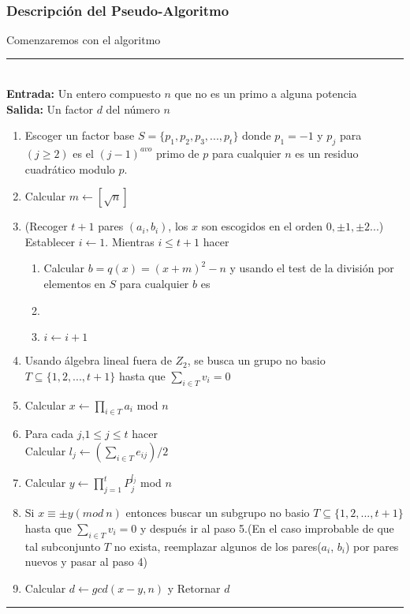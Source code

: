 \documentclass[11pt, conference]{IEEEtran}
\begin{document}
\

\subsubsection[Descripción del Pseudo-Algoritmo]{\textbf{Descripción del Pseudo-Algoritmo}}
Comenzaremos con el algoritmo\\
\rule[0mm]{181mm}{0.1mm}\\
\textbf{Entrada:} Un entero compuesto $n$ que no es un primo a alguna potencia\\
\textbf{Salida:} Un factor $d$ del número $n$
\begin{enumerate}
	\item Escoger un factor base $S=\{p_1,p_2,p_3,...,p_t\}$ donde $p_1 = -1$ y $p_{j}$ para $(j\geq2)$ es el $(j-1)^{avo}$ primo de $p$ para cualquier $n$ es un residuo cuadrático modulo $p$.
	\item Calcular $m  \leftarrow [\sqrt{n}]$
	\item (Recoger $t+1$ pares $(a_{i},b_{i})$, los $x$ son escogidos en el orden $0,\pm1,\pm2...$)\\
	Establecer $i\leftarrow1$. Mientras $i\leq t+1$ hacer
	\begin{enumerate}
		\item Calcular $b = q(x) = (x+m)^{2}-n$ y usando el test de la división por elementos en $S$ para cualquier $b$ es 
		\item 
		\item $i \leftarrow i+1$
	\end{enumerate}
	\item Usando álgebra lineal fuera de $Z_{2}$, se busca un grupo no basio $T\subseteq  \{1,2,...,t+1\}$ hasta que $\sum_{i\in T}v_{i}=0$
	\item Calcular $x \leftarrow \prod_{i\in T}a_{i}$ mod $n$
	\item Para cada $j$,$1\leq j\leq t$ hacer \\
	 Calcular $l_{j} \leftarrow(\sum_{i\in T} e_{ij})/2$
	\item Calcular $y\leftarrow\prod_{j=1}^{t}P^{l_{j}}_{j}$ mod $n$
	\item Si $x \equiv\pm y (mod\ n)$ entonces buscar un subgrupo no basio $T\subseteq  \{1,2,...,t+1\}$ hasta que $\sum_{i\in T}v_{i}=0$ y después ir al paso 5.(En el caso improbable de que tal subconjunto $T$ no exista, reemplazar algunos de los pares($a_i$, $b_i$) por pares nuevos y pasar al paso 4)
	\item Calcular $d  \leftarrow gcd(x-y,n)$ y Retornar $d$
\end{enumerate}
\rule[3mm]{181mm}{0.1mm}
\end{document}

